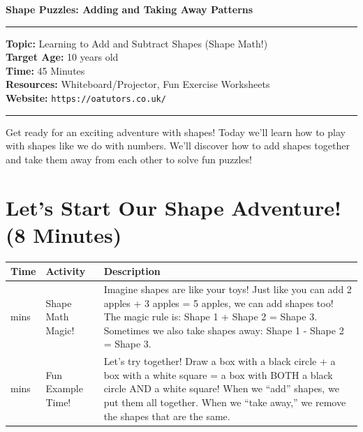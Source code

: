 \documentclass{article}
\begin{document}
\onehalfspacing


\begin{center}
\textbf{\Large Shape Puzzles: Adding and Taking Away Patterns}
\vspace{0.2cm}
\end{center}

\hrule
\vspace{0.1cm}

\textbf{Topic:} Learning to Add and Subtract Shapes (Shape Math!) \\
\textbf{Target Age:} 10 years old \\
\textbf{Time:} 45 Minutes \\
\textbf{Resources:} Whiteboard/Projector, Fun Exercise Worksheets \\
\textbf{Website:} \texttt{https://oatutors.co.uk/}

\vspace{0.2cm}
\hrule
\vspace{0.3cm}

Get ready for an exciting adventure with shapes! Today we'll learn how to play with shapes like we do with numbers. We'll discover how to add shapes together and take them away from each other to solve fun puzzles!

\section{Let's Start Our Shape Adventure! (8 Minutes)}

\begin{tabularx}{\textwidth}{|>{\raggedright\arraybackslash}p{1cm}|>{\raggedright\arraybackslash}p{3cm}|>{\raggedright\arraybackslash}X|}
\hline
\textbf{Time} & \textbf{Activity} & \textbf{Description} \\
\hline
4 mins & Shape Math Magic! & Imagine shapes are like your toys! Just like you can add 2 apples + 3 apples = 5 apples, we can add shapes too! The magic rule is: Shape 1 + Shape 2 = Shape 3. Sometimes we also take shapes away: Shape 1 - Shape 2 = Shape 3. \\
\hline
4 mins & Fun Example Time! & Let's try together! Draw a box with a black circle + a box with a white square = a box with BOTH a black circle AND a white square! When we ``add'' shapes, we put them all together. When we ``take away,'' we remove the shapes that are the same. \\
\hline
\end{tabularx}
\end{document}
